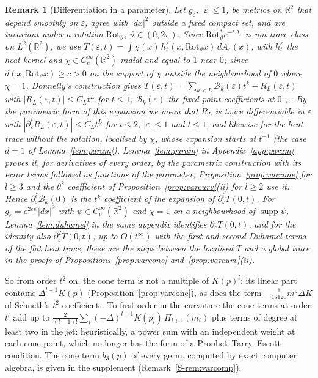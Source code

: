 \documentclass[pdflatex,sn-mathphys-num]{sn-jnl}
\theoremstyle{thmstyleone}%
\theoremstyle{thmstylethree}%
\newtheorem{remark}[theorem]{Remark}%
\newcommand{\R}{\mathbb{R}}
\newcommand{\sref}[1]{\ref*{S-#1}}%
\begin{document}
\begin{remark}[Differentiation in a parameter]\label{rem:param}
Let $g_\varepsilon$, $|\varepsilon|\le1$, be metrics on $\R^2$ that depend smoothly on $\varepsilon$, agree with $|dx|^2$ outside a fixed compact set, and are invariant under a rotation $\mathrm{Rot}_\vartheta$, $\vartheta\in(0,2\pi)$. Since $\mathrm{Rot}_\vartheta^*e^{-t\Delta_\varepsilon}$ is not trace class on $L^2(\R^2)$, we use $T(\varepsilon,t)=\int\chi(x)\,h^\varepsilon_t(x,\mathrm{Rot}_\vartheta x)\,dA_\varepsilon(x)$, with $h^\varepsilon_t$ the heat kernel and $\chi\in C_c^\infty(\R^2)$ radial and equal to $1$ near $0$; since $d(x,\mathrm{Rot}_\vartheta x)\ge c>0$ on the support of $\chi$ outside the neighbourhood of $0$ where $\chi=1$, Donnelly's construction gives $T(\varepsilon,t)=\sum_{k<L}\mathcal B_k(\varepsilon)t^k+R_L(\varepsilon,t)$ with $|R_L(\varepsilon,t)|\le C_Lt^L$ for $t\le1$, $\mathcal B_k(\varepsilon)$ the fixed-point coefficients at $0$ \cite{donnelly1976}, \cite[4.2, Thm~4.8]{dggw2008}. By the \emph{parametric form} of this expansion we mean that $R_L$ is twice differentiable in $\varepsilon$ with $|\partial_\varepsilon^iR_L(\varepsilon,t)|\le C_Lt^L$ for $i\le2$, $|\varepsilon|\le1$ and $t\le1$, and likewise for the heat trace without the rotation, localised by $\chi$, whose expansion starts at $t^{-1}$ (the case $d=1$ of Lemma~\ref{lem:param}). Lemma~\ref{lem:param} in Appendix~\ref{app:param} proves it, for derivatives of every order, by the parametrix construction with its error terms followed as functions of the parameter; Proposition~\ref{prop:varcone} for $l\ge3$ and the $\theta^2$ coefficient of Proposition~\ref{prop:varcurv}(ii) for $l\ge2$ use it. Hence $\partial_\varepsilon^i\mathcal B_k(0)$ is the $t^k$ coefficient of the expansion of $\partial_\varepsilon^iT(0,t)$. For $g_\varepsilon=e^{2\varepsilon\psi}|dx|^2$ with $\psi\in C_c^\infty(\R^2)$ and $\chi=1$ on a neighbourhood of $\operatorname{supp}\psi$, Lemma~\ref{lem:duhamel} in the same appendix identifies $\partial_\varepsilon T(0,t)$, and for the identity also $\partial_\varepsilon^2T(0,t)$, up to $O(t^\infty)$ with the first and second Duhamel terms of the flat heat trace; these are the steps between the localised $T$ and a global trace in the proofs of Propositions~\ref{prop:varcone} and~\ref{prop:varcurv}(ii).
\end{remark}

So from order $t^2$ on, the cone term is not a multiple of $K(p)^l$: its linear part contains $\Delta^{l-1}K(p)$ (Proposition~\ref{prop:varcone}), as does the term $-\frac1{15120}m^5\Delta K$ of Schueth's $t^2$ coefficient \cite[Thm~4.1]{schueth2019}. To first order in the curvature the cone terms at order $t^l$ add up to $\frac2{(l-1)!}\sum_i(-\Delta)^{l-1}K(p_i)\,\Pi_{l+1}(m_i)$ plus terms of degree at least two in the jet: heuristically, a power sum with an independent weight at each cone point, which no longer has the form of a Prouhet--Tarry--Escott condition. The cone term $b_3(p)$ of every germ, computed by exact computer algebra, is given in the supplement (Remark~\sref{rem:varcomp}).
\end{document}
